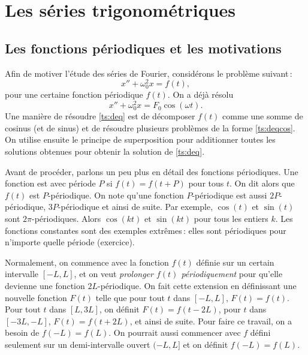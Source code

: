 \sectionnewpage
\section{Les séries trigonométriques} \label{ts:section}


\subsection{Les fonctions périodiques et les motivations}

Afin de motiver l'étude des séries de Fourier, considérons le problème suivant\,:
\begin{equation} \label{ts:deq}
x'' + \omega_0^2 x = f(t) ,
\end{equation}
pour une certaine fonction périodique $f(t)$.
On a déjà résolu
\begin{equation} \label{ts:deqcos}
x'' + \omega_0^2 x = F_0 \cos ( \omega t) .
\end{equation}
Une manière de résoudre \eqref{ts:deq} est de décomposer $f(t)$ comme une somme de cosinus (et de sinus) et de résoudre plusieurs problèmes de la forme  \eqref{ts:deqcos}.  On utilise ensuite le principe de superposition pour additionner toutes les solutions obtenues pour obtenir la solution de \eqref{ts:deq}.

Avant de procéder, parlons un peu plus en détail des fonctions périodiques. 
Une fonction est  \emph{} avec période $P$ si
$f(t) = f(t+P)$ pour tous $t$.  On dit alors que $f(t)$ est $P$-périodique.
On note qu'une fonction $P$-périodique est aussi $2P$-périodique, $3P$-périodique
et ainsi de suite.
Par exemple, $\cos (t)$ et $\sin (t)$ sont
$2\pi$-périodiques.  Alors $\cos (kt)$ et $\sin (kt)$ pour tous les entiers $k$.  Les fonctions constantes sont des exemples extrêmes\,: elles sont périodiques pour n'importe quelle période (exercice). 

Normalement, on commence avec la fonction $f(t)$ définie sur un certain intervalle $[-L,L]$,
et on veut
\emph{prolonger $f(t)$ périodiquement}
pour qu'elle devienne une fonction $2L$-périodique.  On fait cette extension en définissant une nouvelle fonction $F(t)$
telle que pour tout $t$ dans $[-L,L]$, $F(t) = f(t)$.  Pour tout $t$ dans $[L,3L]$,
on définit $F(t) = f(t-2L)$, pour $t$ dans $[-3L,-L]$, $F(t) = f(t+2L)$, et ainsi de suite.
Pour faire ce travail, on a besoin de $f(-L) = f(L)$.
On pourrait aussi commencer avec $f$
défini seulement sur un demi-intervalle ouvert $(-L,L]$ et on définit $f(-L) = f(L)$.

